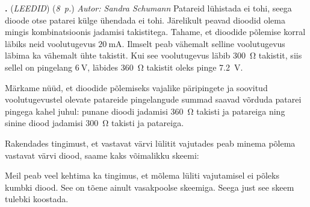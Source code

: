 \documentclass[11pt,a5paper]{article}
\newcommand{\numb}[1]{\vspace{5pt}\textbf{\large #1}}
\newcommand{\nimi}[1]{(\textsl{\small \uppercase{#1}})}
\newcommand{\punktid}[1]{(\emph{#1~p.})}
\newcounter{ylesanne}
\newcommand{\yl}[1]{\addtocounter{ylesanne}{1}\numb{\theylesanne.} \nimi{#1} \newblock{}}
\newcommand{\autor}[1]{\emph{Autor: #1}}%
\begin{document}
\yl{Leedid}
\punktid{8} \autor{Sandra Schumann}
Patareid lühistada ei tohi, seega dioode otse patarei külge ühendada ei tohi. Järelikult peavad dioodid olema mingis kombinatsioonis jadamisi takistitega. Tahame, et dioodide põlemise korral läbiks neid voolutugevus $\SI{20}{\mA}$. Ilmselt peab vähemalt selline voolutugevus läbima ka vähemalt ühte takistit. Kui see voolutugevus läbib \SI{300}{\ohm} takistit, siis sellel on pingelang $\SI{6}{\V}$, läbides \SI{360}{\ohm} takistit oleks pinge \SI{7.2}{\V}.

Märkame nüüd, et dioodide põlemiseks vajalike päripingete ja soovitud voolutugevustel olevate patareide pingelangude summad saavad võrduda patarei pingega kahel juhul: punane dioodi jadamisi \SI{360}{\ohm} takisti ja patareiga ning sinine diood jadamisi \SI{300}{\ohm} takisti ja patareiga.

Rakendades tingimust, et vastavat värvi lülitit vajutades peab minema põlema vastavat värvi diood, saame kaks võimalikku skeemi:
\begin{center}
  \hspace{-1cm}
\end{center}

Meil peab veel kehtima ka tingimus, et mõlema lüliti vajutamisel ei põleks kumbki diood. See on tõene ainult vasakpoolse skeemiga. Seega just see skeem tulebki koostada.
\end{document}
